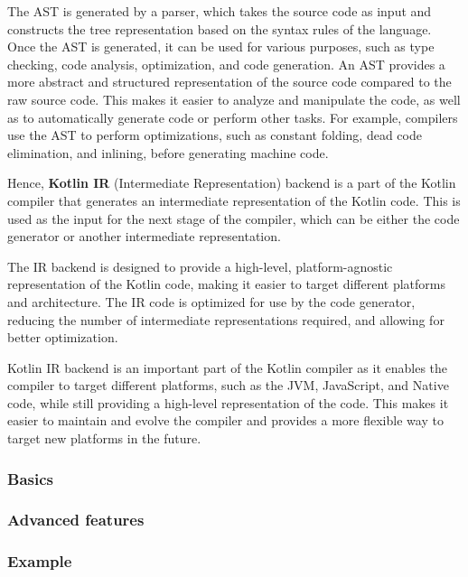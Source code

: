 The AST is generated by a parser, which takes the source code as input and constructs the tree representation based on the syntax rules of the language. Once the AST is generated, it can be used for various purposes, such as type checking, code analysis, optimization, and code generation.\newline
An AST provides a more abstract and structured representation of the source code compared to the raw source code. This makes it easier to analyze and manipulate the code, as well as to automatically generate code or perform other tasks. For example, compilers use the AST to perform optimizations, such as constant folding, dead code elimination, and inlining, before generating machine code.

Hence, \textbf{Kotlin IR} (Intermediate Representation) backend is a part of the Kotlin compiler that generates an intermediate representation of the Kotlin code. This is used as the input for the next stage of the compiler, which can be either the code generator or another intermediate representation.

The IR backend is designed to provide a high-level, platform-agnostic representation of the Kotlin code, making it easier to target different platforms and architecture. The IR code is optimized for use by the code generator, reducing the number of intermediate representations required, and allowing for better optimization.

Kotlin IR backend is an important part of the Kotlin compiler as it enables the compiler to target different platforms, such as the JVM, JavaScript, and Native code, while still providing a high-level representation of the code. This makes it easier to maintain and evolve the compiler and provides a more flexible way to target new platforms in the future.

\subsubsection{Basics}\label{section:compiler_plugin_basics}

\subsubsection{Advanced features}\label{section:compiler_plugin_advaced}
\subsubsection{Example}\label{section:compiler_plugin_example}
